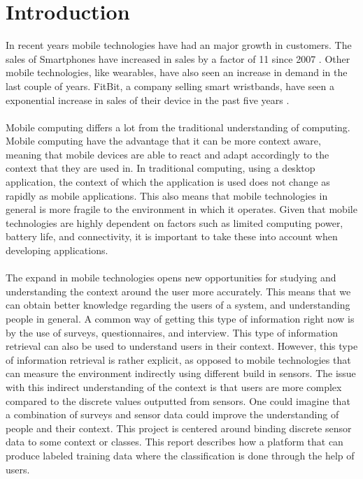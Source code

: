\chapter{Introduction}
\label{cha:introduction}
In recent years mobile technologies have had an major growth in customers. The sales of Smartphones have increased in sales by a factor of 11 since 2007 \parencite{statsia_smartphones}. Other mobile technologies, like wearables, have also seen an increase in demand in the last couple of years. FitBit, a company selling smart wristbands, have seen a exponential increase in sales of their device in the past five years \parencite{statsia_fitbit} .
\\\\
Mobile computing  differs a lot from the traditional understanding of computing. Mobile computing have the advantage that it can be more context aware, meaning that mobile devices are able to react and adapt accordingly to the context that they are used in. In traditional computing, using a desktop application, the context of which the application is used does not change as rapidly as mobile applications. This also means that mobile technologies in general is more fragile to the environment in which it operates. Given that mobile technologies are highly dependent on factors such as limited computing power, battery life, and connectivity, it is important to take these into account when developing applications.
\\\\
The expand in mobile technologies opens new opportunities for studying and understanding the context around the user more accurately. This means that we can obtain better knowledge regarding the users of a system, and understanding people in general. A common way of getting this type of information right now is by the use of surveys, questionnaires, and interview. This type of information retrieval can also be used to understand users in their context. However, this type of information retrieval is rather explicit, as opposed to mobile technologies that can measure the environment indirectly using different build in sensors. The issue with this indirect understanding of the context is that users are more complex compared to the discrete values outputted from sensors. One could imagine that a combination of surveys and sensor data could improve the understanding of people and their context. This project is centered around binding discrete sensor data to some context or classes. This report describes how a platform that can produce labeled training data where the classification is done through the help of users. 

